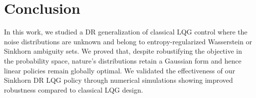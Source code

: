 \documentclass[letterpaper, 10 pt, conference]{ieeeconf}  %
\theoremstyle{ieeeconf}
\begin{document}
\section{Conclusion}
In this work, we studied a DR generalization of classical LQG control where the noise distributions are unknown and belong to entropy-regularized Wasserstein or Sinkhorn ambiguity sets. We proved that, despite robustifying the objective in the probability space, nature's distributions retain a Gaussian form and hence linear policies remain globally optimal. We validated the effectiveness of our Sinkhorn DR LQG policy through numerical simulations showing improved robustness compared to classical LQG design. 


\appendix
\end{document}
